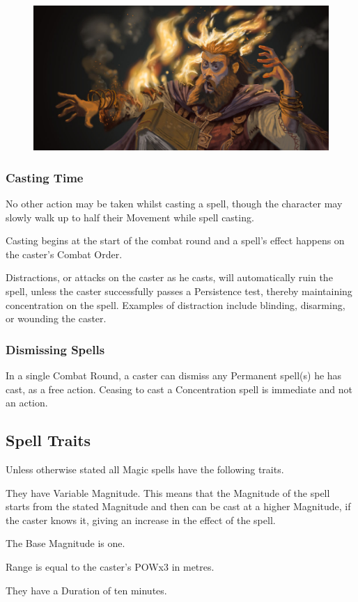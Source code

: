 \begin{figure}[h]
\begin{center}
\includegraphics[scale=0.23]{img/backfire_by_ncorva.jpg}
\end{center}
\end{figure}


\subsubsection{Casting Time}
No other action may be taken whilst casting a spell, though the character may slowly walk up to half their Movement while spell casting. %

Casting begins at the start of the combat round and a spell’s effect happens on the caster’s Combat Order.%

Distractions, or attacks on the caster as he casts, will automatically ruin the spell, unless the caster successfully passes a Persistence test, thereby maintaining concentration on the spell. Examples of distraction include blinding, disarming, or wounding the caster.

\subsubsection{Dismissing Spells}
In a single Combat Round, a caster can dismiss any Permanent spell(s) he has cast, as a free action. Ceasing to cast a Concentration spell is immediate and not an action. 


\subsection{Spell Traits}
Unless otherwise stated all Magic spells have the following traits.

\begin{rpg-list}
\item They have Variable Magnitude. This means that the Magnitude of the spell starts from the stated Magnitude and then can be cast at a higher Magnitude, if the caster knows it, giving an increase in the effect of the spell. %
\item The Base Magnitude is one. 
\item Range is equal to the caster’s POWx3 in metres.
\item They have a Duration of ten minutes.
\end{rpg-list}

